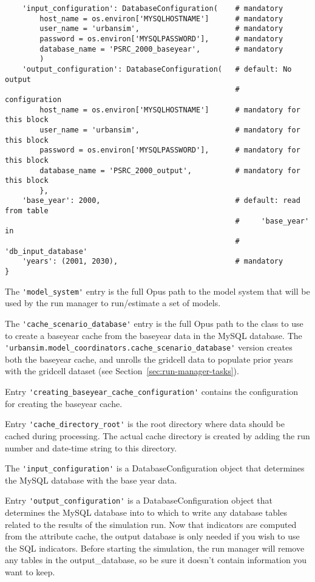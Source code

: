 \begin{verbatim}
    'input_configuration': DatabaseConfiguration(    # mandatory
        host_name = os.environ['MYSQLHOSTNAME']      # mandatory
        user_name = 'urbansim',                      # mandatory
        password = os.environ['MYSQLPASSWORD'],      # mandatory
        database_name = 'PSRC_2000_baseyear',        # mandatory
        )
    'output_configuration': DatabaseConfiguration(   # default: No output
                                                     #     configuration
        host_name = os.environ['MYSQLHOSTNAME']      # mandatory for this block
        user_name = 'urbansim',                      # mandatory for this block
        password = os.environ['MYSQLPASSWORD'],      # mandatory for this block
        database_name = 'PSRC_2000_output',          # mandatory for this block
        },
    'base_year': 2000,                               # default: read from table
                                                     #     'base_year' in
                                                     #     'db_input_database'
    'years': (2001, 2030),                           # mandatory
}
\end{verbatim}
The \verb|'model_system'| entry is the full Opus path to the model system that
will be used by the run manager to run/estimate a set of models.

The \verb|'cache_scenario_database'| entry is the full Opus path to the class to use to
create a baseyear cache from the baseyear data in the MySQL database.  The
\verb|'urbansim.model_coordinators.cache_scenario_database'| version creates  both the
baseyear cache, and unrolls the gridcell data to populate prior years with the
gridcell dataset (see Section~\ref{sec:run-manager-tasks}).

Entry \verb|'creating_baseyear_cache_configuration'| contains the configuration
for creating the baseyear cache.

Entry \verb|'cache_directory_root'| is the root directory where data should be
cached during processing. The actual cache directory is created by adding
the run number and date-time string to this directory.

The \verb|'input_configuration'| is a DatabaseConfiguration object
that determines the MySQL \mysqlindex database with the base year
data.

Entry \verb|'output_configuration'| is a DatabaseConfiguration
object that determines the MySQL \mysqlindex database into to which
to write any database tables related to the results of the
simulation run.  Now that indicators are computed from the attribute
cache, the output database is only needed if you wish to use the SQL
indicators.  Before starting the simulation, the run manager will
remove any tables in the output_database, so be sure it doesn't
contain information you want to keep.

